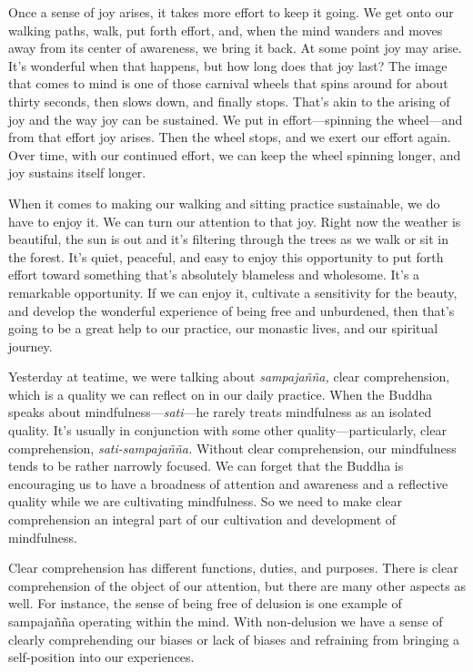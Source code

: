 Once a sense of joy arises, it takes more effort to keep it going. We 
get onto our walking paths, walk, put forth effort, and, when the mind 
wanders and moves away from its center of awareness, we bring it back. 
At some point joy may arise. It's wonderful when that happens, but how 
long does that joy last? The image that comes to mind is one of those 
carnival wheels that spins around for about thirty seconds, then slows 
down, and finally stops. That's akin to the arising of joy and the way 
joy can be sustained. We put in effort---spinning the wheel---and from 
that effort joy arises. Then the wheel stops, and we exert our effort 
again. Over time, with our continued effort, we can keep the wheel 
spinning longer, and joy sustains itself longer.

When it comes to making our walking and sitting practice sustainable, 
we do have to enjoy it. We can turn our attention to that joy. Right 
now the weather is beautiful, the sun is out and it's filtering through 
the trees as we walk or sit in the forest. It's quiet, peaceful, and 
easy to enjoy this opportunity to put forth effort toward something 
that's absolutely blameless and wholesome. It's a remarkable 
opportunity. If we can enjoy it, cultivate a sensitivity for the 
beauty, and develop the wonderful experience of being free and 
unburdened, then that's going to be a great help to our practice, our 
monastic lives, and our spiritual journey.


Yesterday at teatime, we were talking about \emph{sampajañña,} clear 
comprehension, which is a quality we can reflect on in our daily 
practice. When the Buddha speaks about mindfulness---\emph{sati}---he 
rarely treats mindfulness as an isolated quality. It's usually in 
conjunction with some other quality---particularly, clear 
comprehension, \emph{sati-sampajañña.} Without clear comprehension, 
our mindfulness tends to be rather narrowly focused. We can forget that 
the Buddha is encouraging us to have a broadness of attention and 
awareness and a reflective quality while we are cultivating 
mindfulness. So we need to make clear comprehension an integral part of 
our cultivation and development of mindfulness.

Clear comprehension has different functions, duties, and purposes. 
There is clear comprehension of the object of our attention, but there 
are many other aspects as well. For instance, the sense of being free 
of delusion is one example of sampajañña operating within the mind. 
With non-delusion we have a sense of clearly comprehending our biases 
or lack of biases and refraining from bringing a self-position into our 
experiences.

